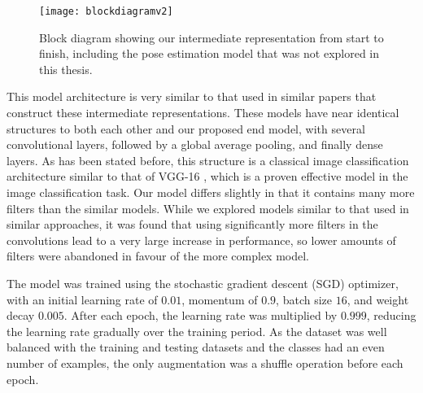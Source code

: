 \begin{figure}[H]
	\texttt{[image: blockdiagramv2]}
	\centering
	\caption{Block diagram showing our intermediate representation from start to finish, including the pose estimation model that was not explored in this thesis.}
	\label{fig:block-diagram}
\end{figure}

This model architecture is very similar to that used in similar papers that construct these intermediate representations. These models have near identical structures to both each other and our proposed end model, with several convolutional layers, followed by a global average pooling, and finally dense layers. As has been stated before, this structure is a classical image classification architecture similar to that of VGG-16 \cite{vgg16}, which is a proven effective model in the image classification task. Our model differs slightly in that it contains many more filters than the similar models. While we explored models similar to that used in similar approaches, it was found that using significantly more filters in the convolutions lead to a very large increase in performance, so lower amounts of filters were abandoned in favour of the more complex model.

The model was trained using the stochastic gradient descent (SGD) optimizer, with an initial learning rate of $0.01$, momentum of $0.9$, batch size $16$, and weight decay $0.005$. After each epoch, the learning rate was multiplied by $0.999$, reducing the learning rate gradually over the training period. As the dataset was well balanced with the training and testing datasets and the classes had an even number of examples, the only augmentation was a shuffle operation before each epoch.